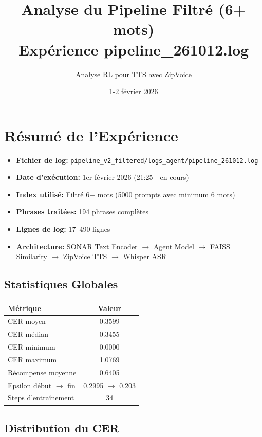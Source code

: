 \documentclass[12pt,a4paper]{article}
\title{\textbf{Analyse du Pipeline Filtré (6+ mots)}\\
\large Expérience pipeline\_261012.log}
\author{Analyse RL pour TTS avec ZipVoice}
\date{1-2 février 2026}
\begin{document}
\maketitle

\section{Résumé de l'Expérience}

\begin{itemize}
    \item \textbf{Fichier de log:} \texttt{pipeline\_v2\_filtered/logs\_agent/pipeline\_261012.log}
    \item \textbf{Date d'exécution:} 1er février 2026 (21:25 - en cours)
    \item \textbf{Index utilisé:} Filtré 6+ mots (5000 prompts avec minimum 6 mots)
    \item \textbf{Phrases traitées:} 194 phrases complètes
    \item \textbf{Lignes de log:} 17~490 lignes
    \item \textbf{Architecture:} SONAR Text Encoder $\rightarrow$ Agent Model $\rightarrow$ FAISS Similarity $\rightarrow$ ZipVoice TTS $\rightarrow$ Whisper ASR
\end{itemize}

\subsection{Statistiques Globales}

\begin{center}
\begin{tabular}{|l|c|}
\hline
\textbf{Métrique} & \textbf{Valeur} \\
\hline
CER moyen & 0.3599 \\
CER médian & 0.3455 \\
CER minimum & 0.0000 \\
CER maximum & 1.0769 \\
Récompense moyenne & 0.6405 \\
\hline
Epsilon début $\rightarrow$ fin & 0.2995 $\rightarrow$ 0.203 \\
Steps d'entraînement & 34 \\
\hline
\end{tabular}
\end{center}

\subsection{Distribution du CER}
\end{document}
